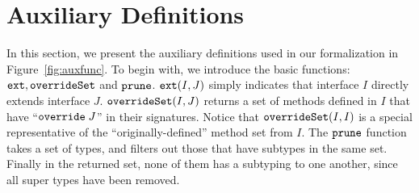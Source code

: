\section{Auxiliary Definitions}\label{subsec:auxdefs}
In this section, we present the auxiliary definitions used in our formalization in 
Figure~\ref{fig:auxfunc}. To begin with, we
introduce the basic functions: $\texttt{ext}, \texttt{overrideSet}$ and $\texttt{prune}$. $\texttt{ext}(I, J)$
simply indicates that interface $I$ directly extends interface $J$. 
$\texttt{overrideSet}(I, J)$ returns a set of methods defined in $I$ that have ``$\texttt{override} \; J$''
in their signatures. Notice that $\texttt{overrideSet}(I, I)$ is a special representative of
the ``originally-defined'' method set from $I$. The $\texttt{prune}$ function takes a set of
types, and filters out those that have subtypes in the same set. Finally in the returned set,
none of them has a subtyping to one another, since all super types have been removed.







